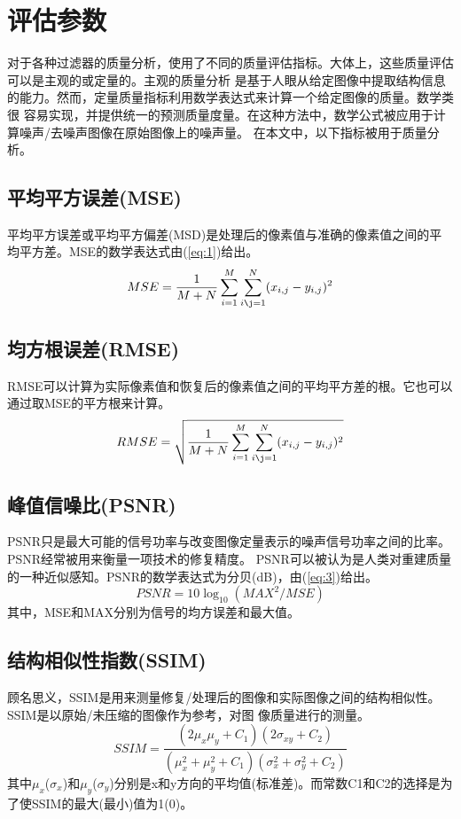 \documentclass[12pt]{article} %
\begin{document}
\section{评估参数}
对于各种过滤器的质量分析，使用了不同的质量评估指标。大体上，这些质量评估可以是主观的或定量的。主观的质量分析
是基于人眼从给定图像中提取结构信息的能力。然而，定量质量指标利用数学表达式来计算一个给定图像的质量。数学类很
容易实现，并提供统一的预测质量度量。在这种方法中，数学公式被应用于计算噪声/去噪声图像在原始图像上的噪声量。
在本文中，以下指标被用于质量分析。

\subsection{平均平方误差(MSE)}
平均平方误差或平均平方偏差(MSD)是处理后的像素值与准确的像素值之间的平均平方差。MSE的数学表达式由(\ref{eq:1})给出。
\begin{equation}
    MSE= \frac{1}{M+N}\sum_{i=1}^M\sum_{i\j=1}^N(x_{i,j}-y_{i,j})^2
    \label{eq:1}
\end{equation}

\subsection{均方根误差(RMSE)}
RMSE可以计算为实际像素值和恢复后的像素值之间的平均平方差的根。它也可以通过取MSE的平方根来计算。
\begin{equation}
    RMSE=\sqrt{\frac{1}{M+N}\sum_{i=1}^M\sum_{i\j=1}^N(x_{i,j}-y_{i,j})^2}
\end{equation}

\subsection{峰值信噪比(PSNR)}
PSNR只是最大可能的信号功率与改变图像定量表示的噪声信号功率之间的比率。PSNR经常被用来衡量一项技术的修复精度。
PSNR可以被认为是人类对重建质量的一种近似感知。PSNR的数学表达式为分贝(dB)，由(\ref{eq:3})给出。
\begin{equation}
    PSNR=10\log_{10}({MAX^2}/{MSE})
    \label{eq:3}
\end{equation}
其中，MSE和MAX分别为信号的均方误差和最大值。

\subsection{结构相似性指数(SSIM)}
顾名思义，SSIM是用来测量修复/处理后的图像和实际图像之间的结构相似性。SSIM是以原始/未压缩的图像作为参考，对图
像质量进行的测量。
\begin{equation}
    SSIM=\frac{(2\mu_x\mu_y+C_1)(2\sigma_{xy}+C_2)}{(\mu_x^2+\mu_y^2+C_1)(\sigma_x^2+\sigma_y^2+C_2)}
\end{equation}
其中$\mu_x$($\sigma_x$)和$\mu_y$($\sigma_y$)分别是x和y方向的平均值(标准差)。而常数C1和C2的选择是为了使SSIM的最大(最小)值为1(0)。
\end{document}
